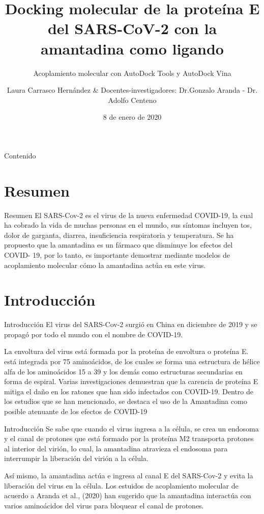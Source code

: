 \documentclass[11pt]{beamer}
\author[Laura]{Laura Carrasco Hernández\inst{1} \& Docentes-investigadores: Dr.Gonzalo Aranda - Dr. Adolfo Centeno  \inst{1}}
\title[Docking molecular]{Docking molecular de la proteína E del SARS-CoV-2 con la amantadina como ligando}
\date{8 de enero de 2020}
\subtitle{Acoplamiento molecular con AutoDock Tools y AutoDock Vina}
\institute[UV]{
	\inst{1}
		Universidad Veracruzana. \\Instituto de Investigaciones Cerebrales.\\
		\vspace{2mm}
	
}
\begin{document}
	
	\begin{frame}
		\maketitle
	\end{frame}

	\begin{frame}{Contenido}
		\tableofcontents
	\end{frame}

	\section{Resumen}
		\begin{frame}{Resumen}
			\justifying El SARS-Cov-2 es el virus de la nueva enfermedad COVID-19, la cual ha cobrado la vida de muchas personas en el mundo, sus síntomas incluyen tos, dolor de garganta, diarrea, insuficiencia respiratoria y temperatura. Se ha propuesto que la amantadina es un fármaco que disminuye los efectos del COVID- 19, por lo tanto, es importante demostrar mediante modelos de acoplamiento molecular cómo la amantadina actúa en este virus.
		\end{frame}
	
	\section{Introducción}
		\begin{frame}{Introducción}
			\justifying El virus del SARS-Cov-2 surgió en China en diciembre de 2019 y se propagó por todo el mundo con el nombre de COVID-19. 
			
			La envoltura del virus está formada por la proteína de envoltura o proteína E. está integrada por 75 aminoácidos, de los cuales se forma una estructura de hélice alfa de los aminoácidos 15 a 39 y los demás como estructuras secundarias en forma de espiral. Varias investigaciones demuestran que la carencia de proteína E mitiga el daño en los ratones que han sido infectados con COVID-19. Dentro de los estudios que se han mencionado, se destaca el uso de la Amantadina como posible atenuante de los efectos de COVID-19
			
			
			\end{frame}
			
			\begin{frame}{Introducción}
			Se sabe que cuando el virus ingresa a la célula, se crea un endosoma y el canal de protones que está formado por la proteína M2 transporta protones al interior del virión, lo cual, la amantadina atravieza el endosoma para interrumpir la liberación del virión a la célula. 
			
			Así mismo, la amantadina actúa e ingresa al canal E del SARS-Cov-2 y evita la liberación del virus en la célula. 
	Los estuidos de acoplamiento molecular de acuerdo a Aranda et al., (2020) han sugerido que la amantadina interactúa con varios aminoácidos del virus para bloquear el canal de protones.
		\end{frame}
		
\end{document}
